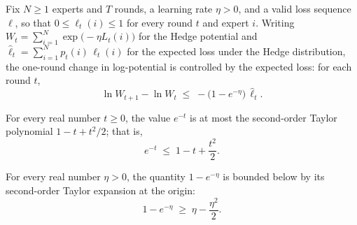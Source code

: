 \begin{lemma}
\label{log_potential_step}
\leanok
{}
Fix $N \ge 1$ experts and $T$ rounds, a learning rate $\eta > 0$, and a valid loss
sequence $\ell$, so that $0 \le \ell_t(i) \le 1$ for every round $t$ and expert $i$.
Writing $W_t = \sum_{i=1}^N \exp\!\bigl(-\eta L_t(i)\bigr)$ for the Hedge potential and
$\widehat{\ell}_t = \sum_{i=1}^N p_t(i)\,\ell_t(i)$ for the expected loss under the
Hedge distribution, the one-round change in log-potential is controlled by the expected
loss: for each round $t$,
\[
  \ln W_{t+1} - \ln W_t \;\le\; -\bigl(1 - e^{-\eta}\bigr)\,\widehat{\ell}_t.
\]
\end{lemma}

\begin{lemma}
\label{exp_neg_le_quadratic}
\leanok
{}
For every real number $t \ge 0$, the value $e^{-t}$ is at most the second-order Taylor
polynomial $1 - t + t^2/2$; that is,
\[
  e^{-t} \;\le\; 1 - t + \frac{t^2}{2}.
\]
\end{lemma}

\begin{lemma}
\label{one_sub_exp_neg_ge}
\leanok
{}
For every real number $\eta > 0$, the quantity $1 - e^{-\eta}$ is bounded below by its
second-order Taylor expansion at the origin:
\[
  1 - e^{-\eta} \;\ge\; \eta - \frac{\eta^{2}}{2}.
\]
\end{lemma}


